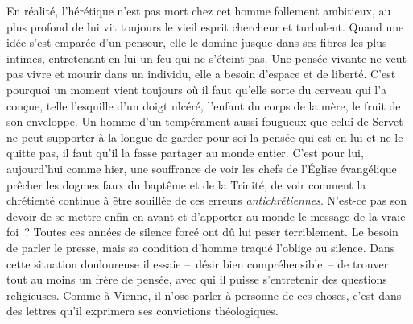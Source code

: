 \documentclass[french,twoside]{book} %
\newcommand{\astermono}{\medskip\centerline{\color{rubric}\large\selectfont{\syms ✻}}\medskip\par}%
\begin{document}
\astermono

\noindent En réalité, l’hérétique n’est pas mort chez cet homme follement ambitieux, au plus profond de lui vit toujours le vieil esprit chercheur et turbulent. Quand une idée s’est emparée d’un penseur, elle le domine jusque dans ses fibres les plus intimes, entretenant en lui un feu qui ne s’éteint pas. Une pensée vivante ne veut pas vivre et mourir dans un individu, elle a besoin d’espace et de liberté. C’est pourquoi un moment vient toujours où il faut qu’elle sorte du cerveau qui l’a conçue, telle l’esquille d’un doigt ulcéré, l’enfant du corps de la mère, le fruit de son enveloppe. Un homme d’un tempérament aussi fougueux que celui de Servet ne peut supporter à la longue de garder pour soi la pensée qui est en lui et ne le quitte pas, il faut qu’il la fasse partager au monde entier. C’est pour lui, aujourd’hui comme hier, une souffrance de voir les chefs de l’Église évangélique prêcher les dogmes faux du baptême et de la Trinité, de voir comment la chrétienté continue à être souillée de ces erreurs \emph{antichrétiennes}. N’est-ce pas son devoir de se mettre enfin en avant et d’apporter au monde le message de la vraie foi ? Toutes ces années de silence forcé ont dû lui peser terriblement. Le besoin de parler le presse, mais sa condition d’homme traqué l’oblige au silence. Dans cette situation douloureuse il essaie – désir bien compréhensible – de trouver tout au moins un frère de pensée, avec qui il puisse s’entretenir des questions religieuses. Comme à Vienne, il n’ose parler à personne de ces choses, c’est dans des lettres qu’il exprimera ses convictions théologiques.\par
\end{document}
